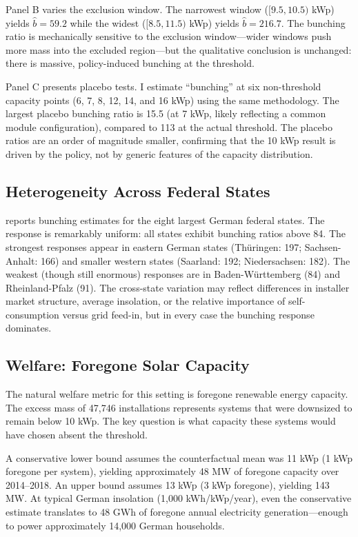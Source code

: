 \documentclass[12pt]{article}
\begin{document}
Panel B varies the exclusion window. The narrowest window ($[9.5, 10.5)$ kWp) yields $\hat{b} = 59.2$ while the widest ($[8.5, 11.5)$ kWp) yields $\hat{b} = 216.7$. The bunching ratio is mechanically sensitive to the exclusion window---wider windows push more mass into the excluded region---but the qualitative conclusion is unchanged: there is massive, policy-induced bunching at the threshold.

Panel C presents placebo tests. I estimate ``bunching'' at six non-threshold capacity points (6, 7, 8, 12, 14, and 16 kWp) using the same methodology. The largest placebo bunching ratio is 15.5 (at 7 kWp, likely reflecting a common module configuration), compared to 113 at the actual threshold. The placebo ratios are an order of magnitude smaller, confirming that the 10 kWp result is driven by the policy, not by generic features of the capacity distribution.



\subsection{Heterogeneity Across Federal States}

 reports bunching estimates for the eight largest German federal states. The response is remarkably uniform: all states exhibit bunching ratios above 84. The strongest responses appear in eastern German states (Th\"{u}ringen: 197; Sachsen-Anhalt: 166) and smaller western states (Saarland: 192; Niedersachsen: 182). The weakest (though still enormous) responses are in Baden-W\"{u}rttemberg (84) and Rheinland-Pfalz (91). The cross-state variation may reflect differences in installer market structure, average insolation, or the relative importance of self-consumption versus grid feed-in, but in every case the bunching response dominates.



\subsection{Welfare: Foregone Solar Capacity}

The natural welfare metric for this setting is foregone renewable energy capacity. The excess mass of 47,746 installations represents systems that were downsized to remain below 10 kWp. The key question is what capacity these systems would have chosen absent the threshold.

A conservative lower bound assumes the counterfactual mean was 11 kWp (1 kWp foregone per system), yielding approximately 48 MW of foregone capacity over 2014--2018. An upper bound assumes 13 kWp (3 kWp foregone), yielding 143 MW. At typical German insolation (1,000 kWh/kWp/year), even the conservative estimate translates to 48 GWh of foregone annual electricity generation---enough to power approximately 14,000 German households.
\end{document}
